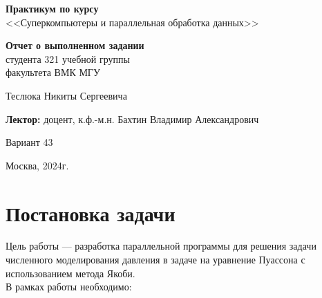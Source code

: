 \documentclass[a4paper, 11pt]{article}
\begin{document}
\begin{titlepage}
    \begin{center}
        \vspace*{1cm}

        \Huge
        \textbf{Практикум по курсу} \\
        \LARGE
        <<Суперкомпьютеры и параллельная обработка данных>>

        \vspace{3cm}

        \Huge
        \textbf{Отчет о выполненном задании} \\
        \Large
        студента 321 учебной группы \\
        факультета ВМК МГУ

        \vspace{0.5cm}

        \LARGE
        Теслюка Никиты Сергеевича

        \vspace{3cm}

        \Large
        \textbf{Лектор:} доцент, к.ф.-м.н. Бахтин Владимир Александрович

        \vspace{5cm}

        \Large
        Вариант 43

        \vfill

        \Large
        Москва, 2024г. 

    \end{center}
\end{titlepage}
\tableofcontents
\newpage

\section*{Постановка задачи}

Цель работы — разработка параллельной программы для решения задачи численного моделирования давления в задаче на уравнение Пуассона с использованием метода Якоби. \\

В рамках работы необходимо:
\end{document}
